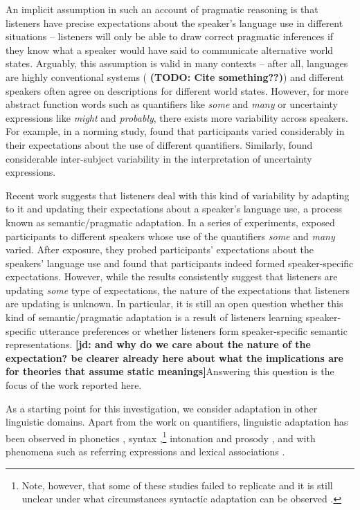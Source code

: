 \documentclass[lucida,biblatex]{sp} %
\newcommand{\jd}[1]{\textcolor{PinkyPurple}{\textbf{[jd: #1]}}}
\newcommand{\todo}[1]{}
\renewcommand{\todo}[1]{{\bf \color{red} (TODO: {#1})}}
\begin{document}
An implicit assumption in such an account of pragmatic reasoning is that listeners have precise expectations about the speaker's language use in different situations -- listeners will only be able to draw correct pragmatic inferences if they know what a speaker would have said to communicate alternative world states. Arguably, this assumption is valid in many contexts -- after all, languages are highly conventional systems (\todo{Cite something??}) and different speakers  often agree on descriptions for different world states. However, for more abstract function words such as quantifiers like \textit{some} and \textit{many} or uncertainty expressions like \textit{might} and \textit{probably}, there exists more variability across speakers. For example, in a norming study, \citet{Yildirim2016} found that participants varied considerably in their expectations about the use of different quantifiers. Similarly, \citet{Wallsten1986} found considerable inter-subject variability in the interpretation of uncertainty expressions. 

Recent work suggests that listeners deal with this kind of variability by adapting to it and updating their expectations about a speaker's language use, a process known as semantic/pragmatic adaptation. In a series of experiments, \citet{Yildirim2016} exposed participants to different speakers whose use of the quantifiers \textit{some} and \textit{many} varied. After exposure, they probed participants' expectations about the speakers' language use and found that participants indeed formed speaker-specific expectations. However, while the results consistently suggest that listeners are updating \textit{some} type of expectations, the nature of the expectations that listeners are updating is unknown. 
In particular, it is still an open question whether this kind of semantic/pragmatic adaptation is a result of listeners learning speaker-specific utterance preferences or whether listeners form speaker-specific semantic representations. 
\jd{and why do we care about the nature of the expectation? be clearer already here about what the implications are for theories that assume static meanings}Answering this question is the focus of the work reported here.

As a starting point for this investigation, we consider adaptation in other linguistic domains. Apart from the work on quantifiers, linguistic adaptation has been observed in  phonetics \citep[e.g.,][]{Goldinger1998,Norris2003,Kraljic2005,Kraljic2007,Babel2012,Kleinschmidt2015}, 
syntax \citep{Kamide2012,Fine2013,Fine2016,Myslin2016,Kroczek2017},\footnote{Note, 
however, that some of these studies failed to replicate and it is still unclear under what 
circumstances syntactic adaptation can be observed \citep[see ][]{Liu2017,HarringtonStack2018}.} intonation and prosody \citep{Kurumada2012,Roettger2019}, and with phenomena such as referring expressions
\citep{Clark1986,Brennan1996,Metzing2003,Horton2005,Brennan2009} and lexical associations \citep{DelaneyBusch2019}. 
\end{document}
